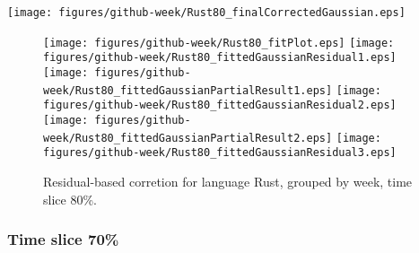 \begin{center}
{\texttt{[image: figures/github-week/Rust80\_finalCorrectedGaussian.eps]}}
\end{center}

\FloatBarrier

\begin{figure}[t]
\centering
{}
{\texttt{[image: figures/github-week/Rust80\_fitPlot.eps]}}
{\texttt{[image: figures/github-week/Rust80\_fittedGaussianResidual1.eps]}}
{\texttt{[image: figures/github-week/Rust80\_fittedGaussianPartialResult1.eps]}}
{\texttt{[image: figures/github-week/Rust80\_fittedGaussianResidual2.eps]}}
{\texttt{[image: figures/github-week/Rust80\_fittedGaussianPartialResult2.eps]}}
{\texttt{[image: figures/github-week/Rust80\_fittedGaussianResidual3.eps]}}
\caption{Residual-based corretion for language Rust, grouped by week, time slice 80\%.}
\end{figure}


\FloatBarrier


\subsubsection{Time slice 70\%}


